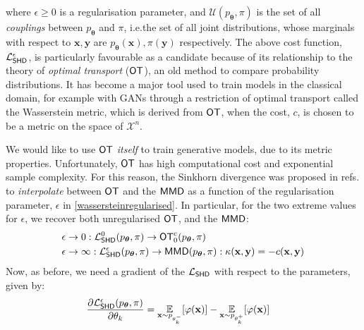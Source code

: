 \noindent where $\epsilon \geq 0 $ is a regularisation parameter, and $\mathcal{U}(p_{\boldsymbol\theta}, \pi)$ is the set of all \textit{couplings} between $p_{\boldsymbol\theta}$ and $\pi$, i.e.\@ the set of all joint distributions, whose marginals with respect to $\mathbf{x}, \mathbf{y}$ are $p_{\boldsymbol\theta}(\mathbf{x}), \pi(\mathbf{y})$ respectively. 
The above cost function, $\mathcal{L}_{\operatorname{\textsf{SHD}}}^\epsilon$, is particularly favourable as a candidate because of its relationship to the theory of \textit{optimal transport}\cite{villani_optimal_2009} ($\operatorname{\textsf{OT}}$),  an old method to compare probability distributions. It has become a major tool used to train models in the classical domain, for example with GANs\cite{arjovsky_wasserstein_2017} through a restriction of optimal transport called the Wasserstein metric, which is derived from
$\operatorname{\textsf{OT}}$, when the cost, $c$, is chosen to be a metric on the space of $\mathcal{X}^n$.

We would like to use $\operatorname{\textsf{OT}}$ \textit{itself} to train generative models, due to its metric properties. Unfortunately, $\operatorname{\textsf{OT}}$ has high computational cost and exponential sample complexity\cite{dudley_speed_1969}. For this reason, the Sinkhorn divergence was proposed in refs. \cite{ramdas_wasserstein_2015, genevay_learning_2017, feydy_interpolating_2018} to \textit{interpolate} between $\operatorname{\textsf{OT}}$ and the $\operatorname{\textsf{MMD}}$ as a function of the regularisation parameter, $\epsilon$ in \eqref{wassersteinregularised}. In particular, for the two extreme values for $\epsilon$, we recover\cite{ramdas_wasserstein_2015} both unregularised $\operatorname{\textsf{OT}}$, and the $\operatorname{\textsf{MMD}}$:
\begin{align}
&\epsilon \rightarrow 0 :\mathcal{L}_{\operatorname{\textsf{SHD}}}^0(p_{\boldsymbol\theta}, \pi)\rightarrow \operatorname{\textsf{OT}}_0^c(p_{\boldsymbol\theta}, \pi)\\
&\epsilon \rightarrow \infty:
\mathcal{L}_{\operatorname{\textsf{SHD}}}^\epsilon(p_{\boldsymbol\theta}, \pi) \rightarrow  \operatorname{\textsf{MMD}}(p_{\boldsymbol\theta}, \pi) : \kappa(\mathbf{x}, \mathbf{y}) = -c(\mathbf{x}, \mathbf{y})
\end{align}
Now, as before, we need a gradient of the $\mathcal{L}_{\operatorname{\textsf{SHD}}}$ with respect to the parameters, given by:
\begin{align}
    \frac{\partial \mathcal{L}_{\operatorname{\textsf{SHD}}}^\epsilon(p_{\boldsymbol\theta}, \pi)}{\partial \theta_k} 
    & = \underset{\substack{\mathbf{x} \sim p_{\theta_k^-} }}{\mathbb{E}}[\varphi(\mathbf{x})] 
    -\underset{\substack{\mathbf{x} \sim p_{\theta_k^+}  }}{\mathbb{E}}[\varphi(\mathbf{x})] \label{sinkhorngradient}
\end{align}

